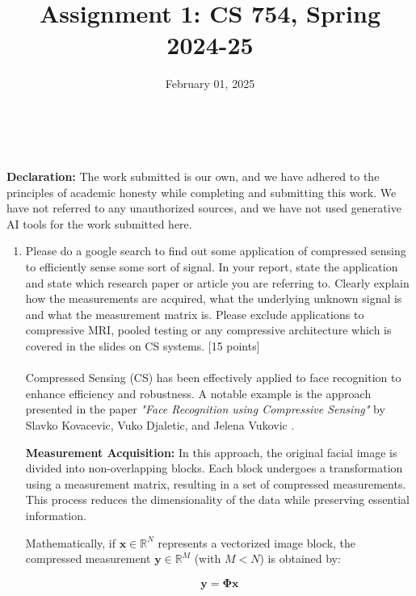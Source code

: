 \documentclass{article}
\title{Assignment 1: CS 754, Spring 2024-25}
\author{
\IEEEauthorblockN{
    \begin{tabular}{cccc}
        \begin{minipage}[t]{0.23\textwidth}
            \centering
            Amitesh Shekhar\\
            IIT Bombay\\
            22b0014@iitb.ac.in
        \end{minipage} & 
        \begin{minipage}[t]{0.23\textwidth}
            \centering
            Anupam Rawat\\
            IIT Bombay\\
            22b3982@iitb.ac.in
        \end{minipage} & 
        \begin{minipage}[t]{0.23\textwidth}
            \centering
            Toshan Achintya Golla\\
            IIT Bombay\\
            22b2234@iitb.ac.in
        \end{minipage} \\
        \\ 
    \end{tabular}
}
}
\date{February 01, 2025}
\begin{document}
\maketitle

\\
\\

\textbf{Declaration:} The work submitted is our own, and
we have adhered to the principles of academic honesty while completing and submitting this work. We have not
referred to any unauthorized sources, and we have not used generative AI tools for the work submitted here.

\begin{enumerate}
    \item 
        Please do a google search to find out some application of compressed sensing to efficiently sense some sort of signal. In your report, state the application and state which research paper or article you are referring to. Clearly explain how the measurements are acquired, what the underlying unknown signal is and what the measurement matrix is. Please exclude applications to compressive MRI, pooled testing or any compressive architecture which is covered in the slides on CS systems. \textsf{[15 points]}
    \\
    \\
    Compressed Sensing (CS) has been effectively applied to face recognition to enhance efficiency and robustness. A notable example is the approach presented in the paper \textit{"Face Recognition using Compressive Sensing"} by Slavko Kovacevic, Vuko Djaletic, and Jelena Vukovic \cite{kovacevic2019face}.

    \textbf{Measurement Acquisition:} In this approach, the original facial image is divided into non-overlapping blocks. Each block undergoes a transformation using a measurement matrix, resulting in a set of compressed measurements. This process reduces the dimensionality of the data while preserving essential information.

    Mathematically, if $\mathbf{x} \in \mathbb{R}^N$ represents a vectorized image block, the compressed measurement $\mathbf{y} \in \mathbb{R}^M$ (with $M < N$) is obtained by:

    \begin{equation}
        \mathbf{y} = \mathbf{\Phi} \mathbf{x}
    \end{equation}


\end{enumerate}
\end{document}
